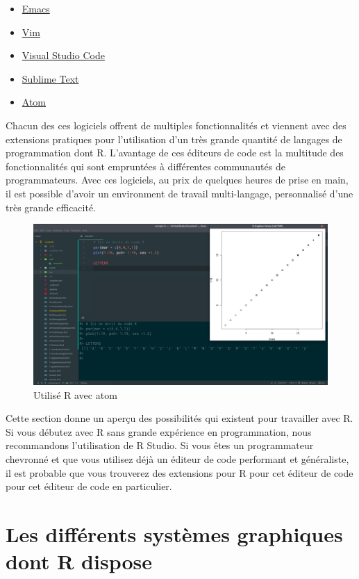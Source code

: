 \documentclass[]{article}
\providecommand{\tightlist}{%
  \setlength{\itemsep}{0pt}\setlength{\parskip}{0pt}}
\begin{document}
\begin{itemize}
\tightlist
\item
  \href{https://www.gnu.org/software/emacs/}{Emacs}
\item
  \href{https://www.vim.org/}{Vim}
\item
  \href{https://code.visualstudio.com/}{Visual Studio Code}
\item
  \href{https://www.sublimetext.com/}{Sublime Text}
\item
  \href{https://atom.io/}{Atom}
\end{itemize}

Chacun des ces logiciels offrent de multiples fonctionnalités et viennent avec des extensions pratiques pour l'utilisation d'un très grande quantité de langages de programmation dont R. L'avantage de ces éditeurs de code est la multitude des fonctionnalités qui sont empruntées à différentes communautés de programmateurs. Avec ces logiciels, au prix de quelques heures de prise en main, il est possible d'avoir un environment de travail multi-langage, personnalisé d'une très grande efficacité.

\begin{figure}
\centering
\includegraphics{img/chap2/ratom.png}
\caption{Utilisé R avec atom}
\end{figure}

Cette section donne un aperçu des possibilités qui existent pour travailler avec R. Si vous débutez avec R sans grande expérience en programmation, nous recommandons l'utilisation de R Studio. Si vous êtes un programmateur chevronné et que vous utilisez déjà un éditeur de code performant et généraliste, il est probable que vous trouverez des extensions pour R pour cet éditeur de code pour cet éditeur de code en particulier.

\hypertarget{les-diffuxe9rents-systuxe8mes-graphiques-dont-r-dispose}{%
\section{Les différents systèmes graphiques dont R dispose}\label{les-diffuxe9rents-systuxe8mes-graphiques-dont-r-dispose}}
\end{document}
